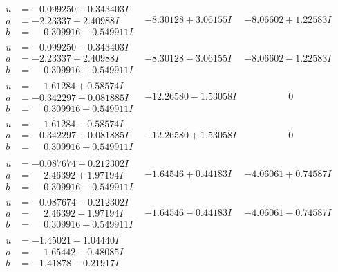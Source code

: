 \documentclass[1p]{elsarticle_modified}
\theoremstyle{definition}
\begin{document}
$$\begin{array}{c|c|c}
\begin{aligned}
u &= -0.099250 + 0.343403 I \\
a &= -2.23337 - 2.40988 I \\
b &= \phantom{-}0.309916 - 0.549911 I\end{aligned}
 & -8.30128 + 3.06155 I & -8.06602 + 1.22583 I \\ \hline\begin{aligned}
u &= -0.099250 - 0.343403 I \\
a &= -2.23337 + 2.40988 I \\
b &= \phantom{-}0.309916 + 0.549911 I\end{aligned}
 & -8.30128 - 3.06155 I & -8.06602 - 1.22583 I \\ \hline\begin{aligned}
u &= \phantom{-}1.61284 + 0.58574 I \\
a &= -0.342297 - 0.081885 I \\
b &= \phantom{-}0.309916 - 0.549911 I\end{aligned}
 & -12.26580 - 1.53058 I & \phantom{-0.000000 } 0 \\ \hline\begin{aligned}
u &= \phantom{-}1.61284 - 0.58574 I \\
a &= -0.342297 + 0.081885 I \\
b &= \phantom{-}0.309916 + 0.549911 I\end{aligned}
 & -12.26580 + 1.53058 I & \phantom{-0.000000 } 0 \\ \hline\begin{aligned}
u &= -0.087674 + 0.212302 I \\
a &= \phantom{-}2.46392 + 1.97194 I \\
b &= \phantom{-}0.309916 - 0.549911 I\end{aligned}
 & -1.64546 + 0.44183 I & -4.06061 + 0.74587 I \\ \hline\begin{aligned}
u &= -0.087674 - 0.212302 I \\
a &= \phantom{-}2.46392 - 1.97194 I \\
b &= \phantom{-}0.309916 + 0.549911 I\end{aligned}
 & -1.64546 - 0.44183 I & -4.06061 - 0.74587 I \\ \hline\begin{aligned}
u &= -1.45021 + 1.04440 I \\
a &= \phantom{-}1.65442 - 0.48085 I \\
b &= -1.41878 - 0.21917 I\end{aligned}

\end{array}$$
\end{document}

